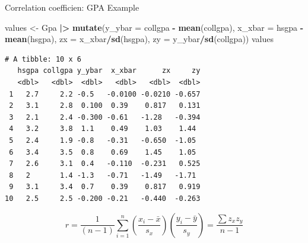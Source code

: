 \documentclass[
  ignorenonframetext,
]{beamer}
\newenvironment{Shaded}{\begin{snugshade}}{\end{snugshade}}
\newcommand{\AttributeTok}[1]{\textcolor[rgb]{0.13,0.29,0.53}{#1}}
\newcommand{\FunctionTok}[1]{\textcolor[rgb]{0.13,0.29,0.53}{\textbf{#1}}}
\newcommand{\NormalTok}[1]{#1}
\newcommand{\OtherTok}[1]{\textcolor[rgb]{0.56,0.35,0.01}{#1}}
\newcommand{\SpecialCharTok}[1]{\textcolor[rgb]{0.81,0.36,0.00}{\textbf{#1}}}
\begin{document}
\begin{frame}[fragile]{Correlation coefficien: GPA Example}
\protect\hypertarget{correlation-coefficien-gpa-example-1}{}
\small

\begin{Shaded}
\begin{Highlighting}[]
\NormalTok{values }\OtherTok{\textless{}{-}}\NormalTok{ Gpa }\SpecialCharTok{|\textgreater{}} 
  \FunctionTok{mutate}\NormalTok{(}\AttributeTok{y\_ybar =}\NormalTok{ collgpa }\SpecialCharTok{{-}} \FunctionTok{mean}\NormalTok{(collgpa), }
         \AttributeTok{x\_xbar =}\NormalTok{ hsgpa }\SpecialCharTok{{-}} \FunctionTok{mean}\NormalTok{(hsgpa),}
         \AttributeTok{zx =}\NormalTok{ x\_xbar}\SpecialCharTok{/}\FunctionTok{sd}\NormalTok{(hsgpa), }\AttributeTok{zy =}\NormalTok{ y\_ybar}\SpecialCharTok{/}\FunctionTok{sd}\NormalTok{(collgpa))}
\NormalTok{values}
\end{Highlighting}
\end{Shaded}

\begin{verbatim}
# A tibble: 10 x 6
   hsgpa collgpa y_ybar  x_xbar      zx     zy
   <dbl>   <dbl>  <dbl>   <dbl>   <dbl>  <dbl>
 1   2.7     2.2 -0.5   -0.0100 -0.0210 -0.657
 2   3.1     2.8  0.100  0.39    0.817   0.131
 3   2.1     2.4 -0.300 -0.61   -1.28   -0.394
 4   3.2     3.8  1.1    0.49    1.03    1.44 
 5   2.4     1.9 -0.8   -0.31   -0.650  -1.05 
 6   3.4     3.5  0.8    0.69    1.45    1.05 
 7   2.6     3.1  0.4   -0.110  -0.231   0.525
 8   2       1.4 -1.3   -0.71   -1.49   -1.71 
 9   3.1     3.4  0.7    0.39    0.817   0.919
10   2.5     2.5 -0.200 -0.21   -0.440  -0.263
\end{verbatim}

\normalsize

\[r=\frac{1}{(n-1)}\sum_{i=1}^n \left(\frac{x_i-\bar{x}}{s_x}\right)\left(\frac{y_i-\bar{y}}{s_y}\right)=\frac{\sum z_x z_y}{n-1}\]
\end{frame}
\end{document}
